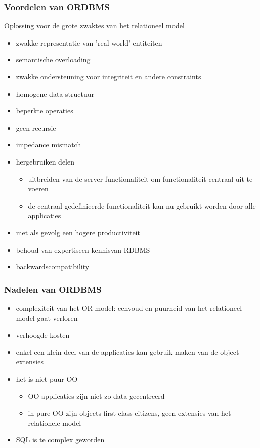 \documentclass[a4paper,12pt]{article}
\begin{document}
\subsubsection{Voordelen van ORDBMS}
Oplossing voor de grote zwaktes van het relationeel model
\begin{itemize}
\item zwakke representatie van 'real-world' entiteiten
\item semantische overloading
\item zwakke ondersteuning voor integriteit en andere constraints
\item homogene data structuur
\item beperkte operaties
\item geen recursie
\item impedance mismatch
\item hergebruiken delen
\begin{itemize}
\item uitbreiden van de server functionaliteit om functionaliteit centraal uit te voeren
\item de centraal gedefinieerde functionaliteit kan nu gebruikt worden door alle applicaties
\end{itemize}
\item met als gevolg een hogere productiviteit
\item behoud van expertiseen kennisvan RDBMS
\item backwardscompatibility
\end{itemize}

\subsubsection{Nadelen van ORDBMS}
\begin{itemize}
\item complexiteit van het OR model: eenvoud en puurheid van het relationeel model gaat verloren
\item verhoogde kosten
\item enkel een klein deel van de applicaties kan gebruik maken van de object extensies
\item het is niet puur OO
\begin{itemize}
\item OO applicaties zijn niet zo data gecentreerd
\item in pure OO zijn objects first class citizens, geen extensies van het relationele model
\end{itemize}
\item SQL is te complex geworden
\end{itemize}
\end{document}
